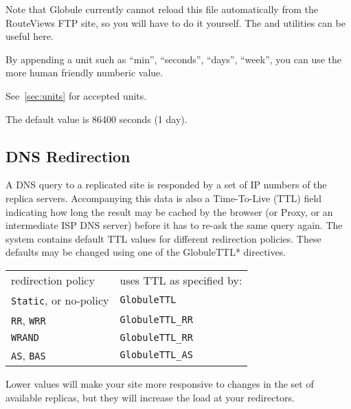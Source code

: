 \documentclass[10pt,a4paper]{article}
\makeatletter
\newenvironment{p}{\@open{P}{}}{\@close{P}}
\newenvironment{p}{}{\par}
\newcommand\subsectionbr{}
\makeatother
\begin{document}
\begin{p}
Note that Globule currently cannot reload this file automatically from the
RouteViews FTP site, so you will have to do it yourself.  The
 and
utilities can be useful here.
\end{p}

\begin{p}
By appending a unit such as ``min'', ``seconds'', ``days'', ``week'', you can
use the more human friendly numberic value.

See~\ref{sec:units} for accepted units.

The default value is 86400 seconds (1 day).
\end{p}


\newpage
\subsection{DNS Redirection\subsectionbr}

\begin{p}
A DNS query to a replicated site is responded by a set of IP numbers of the
replica servers.  Accompanying this data is also a Time-To-Live (TTL) field
indicating how long the result may be cached by the browser (or Proxy, or an
intermediate ISP DNS server) before it has to re-ask the same query again.
The system contains default TTL values for different redirection policies.
These defaults may be changed using one of the GlobuleTTL* directives.
\end{p}

\begin{p}
\begin{tabular}{ll}
redirection policy             & uses TTL as specified by: \\
\texttt{Static}, or no-policy  & \texttt{GlobuleTTL} \\
\texttt{RR}, \texttt{WRR}      & \texttt{GlobuleTTL\_RR} \\
\texttt{WRAND}                 & \texttt{GlobuleTTL\_RR} \\
\texttt{AS}, \texttt{BAS}      & \texttt{GlobuleTTL\_AS} \\
\end{tabular}
\end{p}

\begin{p}
Lower values will make your site more responsive to changes in the set of
available replicas, but they will increase the load at your redirectors.
\end{p}
\end{document}
